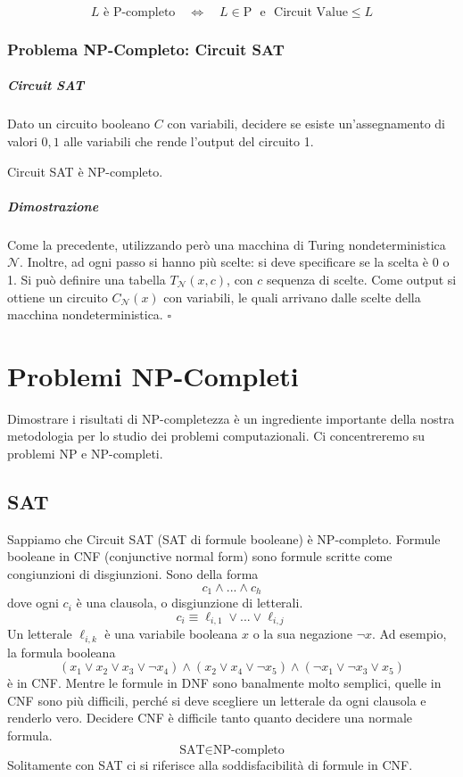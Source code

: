 \begin{corollary}
    $$
        L \text{ è P-completo} \quad \Leftrightarrow \quad L \in\text{P ~e~ Circuit Value} \leq L
    $$
\end{corollary}


\subsection{Problema NP-Completo: Circuit SAT}
\paragraph{Circuit SAT} Dato un circuito booleano $C$ con variabili, decidere se esiste un'assegnamento di valori $0,1$ alle variabili che rende l'output del circuito 1.

\begin{theorem}
    Circuit SAT è NP-completo.
\end{theorem}

\paragraph{Dimostrazione} Come la precedente, utilizzando però una macchina di Turing nondeterministica $\mathcal{N}$. Inoltre, ad ogni passo si hanno più scelte: si deve specificare se la scelta è 0 o 1. Si può definire una tabella $T_\mathcal{N}(x,c)$, con $c$ sequenza di scelte. Come output si ottiene un circuito $C_\mathcal{N}(x)$ con variabili, le quali arrivano dalle scelte della macchina nondeterministica. \hfill$\square$



\chapter{Problemi NP-Completi}
Dimostrare i risultati di NP-completezza è un ingrediente importante della nostra metodologia per lo studio dei problemi computazionali. Ci concentreremo su problemi NP e NP-completi. 

\section{SAT}
Sappiamo che Circuit SAT (SAT di formule booleane) è NP-completo. Formule booleane in CNF (conjunctive normal form) sono formule scritte come congiunzioni di disgiunzioni. Sono della forma
$$
    c_1 \land ... \land c_h
$$
dove ogni $c_i$ è una clausola, o disgiunzione di letterali. 
$$
    c_i \equiv \ell_{i,1} \lor ... \lor \ell_{i,j}
$$
Un letterale $\ell_{i,k}$ è una variabile booleana $x$ o la sua negazione $\lnot x$. Ad esempio, la formula booleana
$$
    (x_1\lor x_2\lor x_3\lor\lnot x_4) \land
    (x_2\lor x_4\lor\lnot x_5) \land
    (\lnot x_1\lor\lnot x_3\lor x_5)
$$
è in CNF. Mentre le formule in DNF sono banalmente molto semplici, quelle in CNF sono più difficili, perché si deve scegliere un letterale da ogni clausola e renderlo vero. Decidere CNF è difficile tanto quanto decidere una normale formula.
$$
    \text{SAT} \in \text{NP-completo}
$$
Solitamente con SAT ci si riferisce alla soddisfacibilità di formule in CNF.

